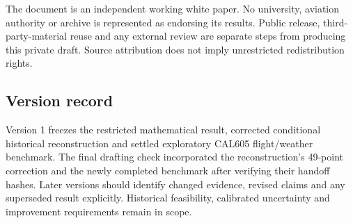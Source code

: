 The document is an independent working white paper. No university, aviation authority or archive is represented as endorsing its results. Public release, third-party-material reuse and any external review are separate steps from producing this private draft. Source attribution does not imply unrestricted redistribution rights.

\subsection{Version record}
Version 1 freezes the restricted mathematical result, corrected conditional historical reconstruction and settled exploratory CAL605 flight/weather benchmark. The final drafting check incorporated the reconstruction's 49-point correction and the newly completed benchmark after verifying their handoff hashes. Later versions should identify changed evidence, revised claims and any superseded result explicitly. Historical feasibility, calibrated uncertainty and improvement requirements remain in scope.
